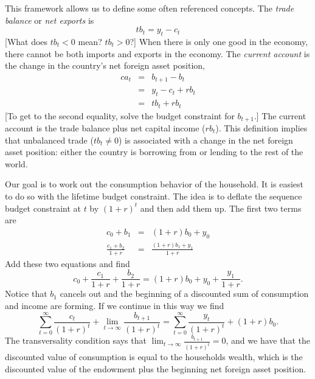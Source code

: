 \documentclass[11pt,pdftex,twoside,letterpaper]{exam}
\begin{document}
This framework allows us to define some often referenced concepts. The \textit{trade balance} or \textit{net exports} is
\begin{equation}\label{eq:tb-def}
  tb_t = y_t-c_t
\end{equation}
[What does $tb_t<0$ mean? $tb_t>0$?] When there is only one good in the economy, there cannot be both imports and exports in the economy. The \textit{current account} is the change in the country's net foreign asset position,
\begin{eqnarray}
  ca_t &=& b_{t+1}-b_t \\
     &=& y_{t} - c_t + rb_t\\
     &=& tb_t + rb_t
\end{eqnarray}
[To get to the second equality, solve the budget constraint for $b_{t+1}$.] The current account is the trade balance plus net capital income ($rb_t$). This definition implies that  unbalanced trade ($tb_t \neq 0$) is associated with a change in the net foreign asset position: either the country is borrowing from or lending to the rest of the world.

Our goal is to work out the consumption behavior of the household. It is easiest to do so with the lifetime budget constraint. The idea is to deflate the sequence budget constraint at $t$ by $(1+r)^t$ and then add them up. The first two terms are
\begin{eqnarray}
  c_0 + b_1 &=& (1+r)b_0 +y_0 \\
  \frac{c_1 +b_2}{1+r} &=& \frac{(1+r)b_1+y_1}{1+r}
\end{eqnarray}
Add these two equations and find
\begin{equation}\label{eq:lifetime-budget-step}
  c_0 +\frac{c_1}{1+r} +\frac{b_2}{1+r} = (1+r)b_0 + y_0 + \frac{y_1}{1+r}.
\end{equation}
Notice that $b_1$ cancels out and the beginning of a discounted sum of consumption and income are forming. If we continue in this way we find
\begin{equation}\label{eq:lifetime-budget}
  \sum_{t=0}^{\infty}\frac{c_t}{(1+r)^t} + \lim_{t \rightarrow \infty}\frac{b_{t+1}}{(1+r)^t} = \sum_{t=0}^{\infty}\frac{y_t}{(1+r)^t}+(1+r)b_0.
\end{equation}
The transversality condition says that $\lim_{t \rightarrow \infty}\frac{b_{t+1}}{(1+r)^t} =0$, and we have that the discounted value of consumption is equal to the households wealth, which is the discounted value of the endowment plus the beginning net foreign asset position.
\end{document}

